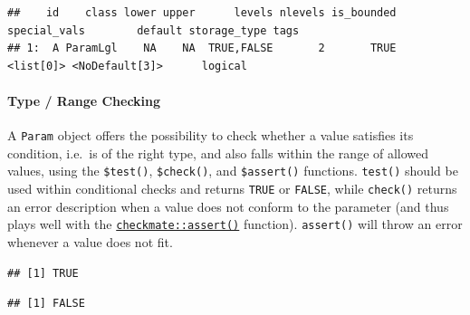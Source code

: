 \documentclass[
]{scrbook}
\newenvironment{Shaded}{\begin{snugshade}}{\end{snugshade}}
\newcommand{\ConstantTok}[1]{\textcolor[rgb]{0.00,0.00,0.00}{#1}}
\newcommand{\FunctionTok}[1]{\textcolor[rgb]{0.00,0.00,0.00}{#1}}
\newcommand{\NormalTok}[1]{#1}
\newcommand{\SpecialCharTok}[1]{\textcolor[rgb]{0.00,0.00,0.00}{#1}}
\newcommand{\StringTok}[1]{\textcolor[rgb]{0.31,0.60,0.02}{#1}}
\renewenvironment{Shaded} {\begin{snugshade}\small} {\end{snugshade}}
\begin{document}
\begin{verbatim}
##    id    class lower upper      levels nlevels is_bounded special_vals        default storage_type tags
## 1:  A ParamLgl    NA    NA  TRUE,FALSE       2       TRUE    <list[0]> <NoDefault[3]>      logical
\end{verbatim}

\hypertarget{type-range-checking}{%
\paragraph{Type / Range Checking}\label{type-range-checking}}

A \texttt{Param} object offers the possibility to check whether a value satisfies its condition, i.e.~is of the right type, and also falls within the range of allowed values, using the \texttt{\$test()}, \texttt{\$check()}, and \texttt{\$assert()} functions.
\texttt{test()} should be used within conditional checks and returns \texttt{TRUE} or \texttt{FALSE}, while \texttt{check()} returns an error description when a value does not conform to the parameter (and thus plays well with the \href{https://www.rdocumentation.org/packages/checkmate/topics/assert}{\texttt{checkmate::assert()}} function).
\texttt{assert()} will throw an error whenever a value does not fit.

\begin{Shaded}
\end{Shaded}

\begin{verbatim}
## [1] TRUE
\end{verbatim}

\begin{Shaded}
\end{Shaded}

\begin{verbatim}
## [1] FALSE
\end{verbatim}

\begin{Shaded}
\end{Shaded}
\end{document}
